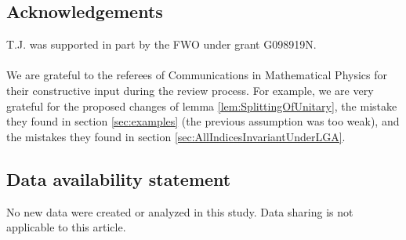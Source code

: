 \documentclass[11pt,a4paper,twoside]{article}
\numberwithin{equation}{section}
\begin{document}
	\subsection*{Acknowledgements}
	T.J. was supported in part by the FWO under grant G098919N.\\\\
	We are grateful to the referees of Communications in Mathematical Physics for their constructive input during the review process. For example, we are very grateful for the proposed changes of lemma \ref{lem:SplittingOfUnitary}, the mistake they found in section \ref{sec:examples} (the previous assumption was too weak), and the mistakes they found in section \ref{sec:AllIndicesInvariantUnderLGA}.
	\subsection*{Data availability statement}
	No new data were created or analyzed in this study. Data sharing is not applicable to this article.
\end{document}
